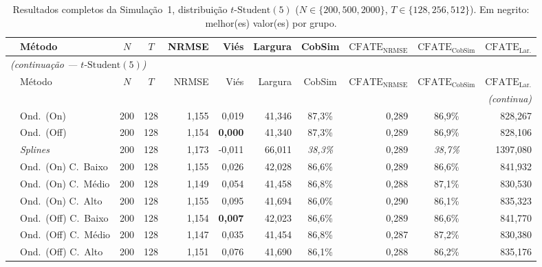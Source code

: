\begin{landscape}
{\footnotesize
\begin{longtable}{@{}llccrrrcrcr@{}}
\caption{Resultados completos da Simulação~1, distribuição \(t\text{-Student}(5)\) (\(N \in \{200, 500, 2000\}\), \(T \in \{128, 256, 512\}\)). Em negrito: melhor(es) valor(es) por grupo.}\label{tab:resultados_sim1_t} \\
\toprule
 & Método & $N$ & $T$ & NRMSE & Viés & Largura & CobSim & $\mathrm{CFATE}_{\mathrm{NRMSE}}$ & $\mathrm{CFATE}_{\mathrm{CobSim}}$ & $\mathrm{CFATE}_{\mathrm{Lar.}}$ \\
\midrule
\endfirsthead
\multicolumn{11}{l}{\itshape (continuação --- \(t\text{-Student}(5)\))} \\
\toprule
 & Método & $N$ & $T$ & NRMSE & Viés & Largura & CobSim & $\mathrm{CFATE}_{\mathrm{NRMSE}}$ & $\mathrm{CFATE}_{\mathrm{CobSim}}$ & $\mathrm{CFATE}_{\mathrm{Lar.}}$ \\
\midrule
\endhead
\midrule \multicolumn{11}{r}{\itshape (continua)} \\
\endfoot
\bottomrule
\endlastfoot
  \multirow{9}{*}{\rotatebox[origin=c]{90}{Sigmoide}} & Ond.\ (On) & 200 & 128 & 1{,}155 & 0{,}019 & 41{,}346 & 87{,3\%} & 0{,}289 &  86{,}9\% & 828{,}267 \\*
   & Ond.\ (Off) & 200 & 128 & 1{,}154 & \textbf{0{,000}} & 41{,}340 & 87{,3\%} & 0{,}289 &  86{,}9\% & 828{,}106 \\*
   & \emph{Splines} & 200 & 128 & 1{,}173 & -0{,}011 & 66{,}011 & \textit{38{,}3\%} & 0{,}289 &  \textit{38{,}7\%} & 1397{,}080 \\*
   & Ond.\ (On) C.\ Baixo & 200 & 128 & 1{,}155 & 0{,}026 & 42{,}028 & 86{,}6\% & 0{,}289 &  86{,}6\% & 841{,}932 \\*
   & Ond.\ (On) C.\ Médio & 200 & 128 & 1{,}149 & 0{,}054 & 41{,}458 & 86{,}8\% & 0{,}288 &  87{,}1\% & 830{,}530 \\*
   & Ond.\ (On) C.\ Alto & 200 & 128 & 1{,}155 & 0{,}095 & 41{,}694 & 86{,}0\% & 0{,}290 &  86{,}1\% & 835{,}323 \\*
   & Ond.\ (Off) C.\ Baixo & 200 & 128 & 1{,}154 & \textbf{0{,}007} & 42{,}023 & 86{,}6\% & 0{,}289 &  86{,}6\% & 841{,}770 \\*
   & Ond.\ (Off) C.\ Médio & 200 & 128 & 1{,147} & 0{,}035 & 41{,}454 & 86{,}8\% & 0{,}287 &  87{,}2\% & 830{,}380 \\*
   & Ond.\ (Off) C.\ Alto & 200 & 128 & 1{,}151 & 0{,}076 & 41{,}690 & 86{,}1\% & 0{,}288 &  86{,}2\% & 835{,}176 \\

\end{longtable}}
\end{landscape}
